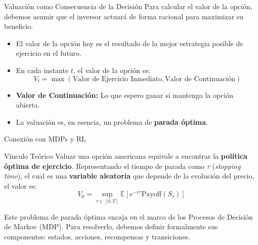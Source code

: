 \documentclass[xcolor=dvipsnames, handout]{beamer}
\begin{document}
\begin{frame}{Valuaci\'on como Consecuencia de la Decisi\'on}
Para calcular el valor de la opci\'on, debemos asumir que el inversor actuar\'a de forma racional para maximizar su beneficio.

\begin{itemize}
    \item El valor de la opci\'on hoy es el resultado de la mejor estrategia posible de ejercicio en el futuro.
    \item En cada instante $t$, el valor de la opci\'on es:
    \[ V_t = \max \left( \text{Valor de Ejercicio Inmediato}, \text{Valor de Continuaci\'on} \right) \]
\end{itemize}

\begin{itemize}
    \item<2-> \textbf{Valor de Continuaci\'on:} Lo que espero ganar si mantengo la opci\'on abierta.
    \item<3->  La valuaci\'on es, en esencia, un problema de \textbf{parada \'optima}.
\end{itemize}
\end{frame}

\begin{frame}{Conexi\'on con MDPs y RL}
\begin{block}{V\'inculo Te\'orico}
    Valuar una opci\'on americana equivale a encontrar la \textbf{pol\'itica \'optima de ejercicio}. Representando el tiempo de parada como $\tau$ (\textit{stopping time}), el cual es una \textbf{variable aleatoria} que depende de la evolución del precio, el valor es:
    \[ V_0 = \sup_{\tau \in [0,T]} \mathbb{E}[ e^{-r\tau} \text{Payoff}(S_\tau) ] \]
\end{block}

Este problema de parada \'optima encaja en el marco de los Procesos de Decisi\'on de Markov (MDP). Para resolverlo, debemos definir formalmente sus componentes: estados, acciones, recompensas y transiciones.
\end{frame}
\end{document}
